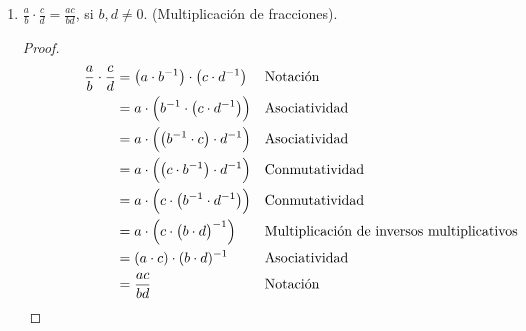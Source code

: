 \documentclass[11pt]{article}
\begin{document}
\begin{enumerate}[label=\alph*)]
    \item $\frac{a}{b} \cdot \frac{c}{d} = \frac{ac}{bd}$, si $b, d \neq 0$. (Multiplicación de fracciones).
    \vspace{-1em}\begin{proof}
    \begin{align*}\qquad \ \qquad
    \frac{a}{b} \cdot \frac{c}{d} &= \left( a \cdot b^{-1} \right) \cdot \left( c \cdot d^{-1} \right) && \text{Notación}\\
    &= a \cdot \Bigl( b^{-1} \cdot \left( c \cdot d^{-1} \right) \Bigr) && \text{Asociatividad}\\
    &= a\cdot \Bigl(\bigl(b^{-1}\cdot c\bigr) \cdot d^{-1}\Bigr) && \text{Asociatividad}\\
    &= a\cdot \Bigl(\bigl(c\cdot b^{-1}\bigr) \cdot d^{-1}\Bigr) && \text{Conmutatividad}\\
    &= a\cdot \Bigl(c\cdot \bigl(b^{-1}\cdot d^{-1}\bigr)\Bigr) && \text{Conmutatividad}\\
    &= a\cdot \Bigl(c\cdot \bigl(b\cdot d\bigr)^{-1}\Bigr) && \text{Multiplicación de inversos multiplicativos}\\
    &= (a\cdot c) \cdot (b\cdot d)^{-1} && \text{Asociatividad}\\
    &= \frac{ac}{bd} && \text{Notación} \qedhere
    \end{align*}    
    \end{proof} \vspace{-1em}
    

\end{enumerate}
\end{document}
